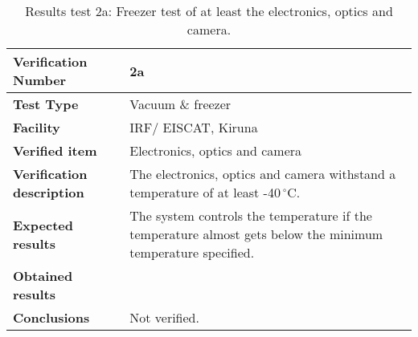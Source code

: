 \begin{table}[H]
\centering

\begin{tabular}{|m{}| m{} |}
\hline
\textbf{Verification Number} 		& 2a 							 \\ \hline
\textbf{Test Type} 					& Vacuum \& freezer				 \\ \hline
\textbf{Facility} 					& IRF/ EISCAT, Kiruna 			 \\ \hline
\textbf{Verified item} 				& Electronics, optics and camera \\ \hline

\textbf{Verification description} 	& The electronics, optics and camera withstand a temperature of at least -40\,$^\circ$C. \\ \hline

\textbf{Expected results} 			& The system controls the temperature if the temperature almost gets below the minimum temperature specified.\\ \hline

\textbf{Obtained results} 			& \\ \hline

\textbf{Conclusions} 				& Not verified.		\\ \hline
\end{tabular}
\caption{Results test 2a: Freezer test of at least the electronics, optics and camera.}
\label{tab:testresult2:thermal}
\end{table}


\raggedbottom